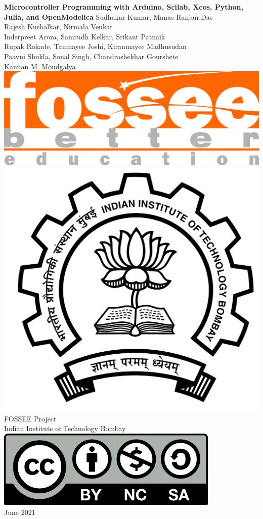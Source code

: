 \begin{center}
    {\bf {\Huge Microcontroller Programming with Arduino, Scilab, Xcos,
            Python, Julia, and OpenModelica}}
    \vfill
    Sudhakar Kumar, Manas Ranjan Das \\
    Rajesh Kushalkar, Nirmala Venkat \\
    Inderpreet Arora, Samrudh Kelkar, Srikant Patnaik \\
    Rupak Rokade, Tanmayee Joshi, Kiranmayee Madhusudan \\
    Paavni Shukla, Sonal Singh, Chandrashekhar Gourshete \\
    Kannan M. Moudgalya \\
    \vfill
    \includegraphics[width=0.3\linewidth]{suppl/fossee_logo_hi.png} \quad
    \includegraphics[width=0.2\linewidth]{suppl/IITB-logo-HighRes.png} \\
    FOSSEE Project \\
    Indian Institute of Technology Bombay \\ [2mm]
    \includegraphics[width=0.15\linewidth]{suppl/by-nc-sa.png} \\ [1mm]
    June 2021
\end{center}

\clearpage
